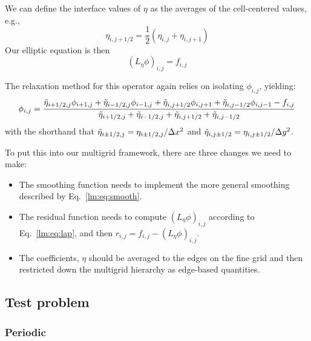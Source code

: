 We can define the interface values of $\eta$ as the averages of the
cell-centered values, e.g.,
\begin{equation}
  \eta_{i,j+1/2} = \frac{1}{2}(\eta_{i,j} + \eta_{i,j+1})
\end{equation}
Our elliptic equation is then 
\begin{equation}
(L_\eta \phi)_{i,j} = f_{i,j}
\end{equation}

The relaxation method for this operator again relies on isolating
$\phi_{i,j}$, yielding:
\begin{equation}
\phi_{i,j} = \frac{\tilde{\eta}_{i+1/2,j}\phi_{i+1,j} + \tilde{\eta}_{i-1/2,j}\phi_{i-1,j} +
                   \tilde{\eta}_{i,j+1/2}\phi_{i,j+1} + \tilde{\eta}_{i,j-1/2}\phi_{i,j-1} -
                   f_{i,j} } 
                  {\tilde{\eta}_{i+1/2,j} + \tilde{\eta}_{i-1/2,j} + 
                   \tilde{\eta}_{i,j+1/2} + \tilde{\eta}_{i,j-1/2}}
\label{lm:eq:smooth}
\end{equation}
with the shorthand that $\tilde{\eta}_{i\pm1/2,j} = \eta_{i\pm1/2,j}/\Delta x^2$
and $\tilde{\eta}_{i,j\pm1/2} = \eta_{i,j\pm1/2}/\Delta y^2$.

To put this into our multigrid framework, there are three changes we
need to make:
\begin{itemize}
\item The smoothing function needs to implement the more general smoothing
described by Eq.~\ref{lm:eq:smooth}.

\item The residual function needs to compute $(L_\eta \phi)_{i,j}$ according
to Eq.~\ref{lm:eq:lap}, and then $r_{i,j} = f_{i,j} - (L_\eta \phi)_{i,j}$.

\item The coefficients, $\eta$ should be averaged to the edges on the fine
grid and then restricted down the multigrid hierarchy as edge-based 
quantities.
\end{itemize}

\subsection{Test problem}

\subsubsection{Periodic}

